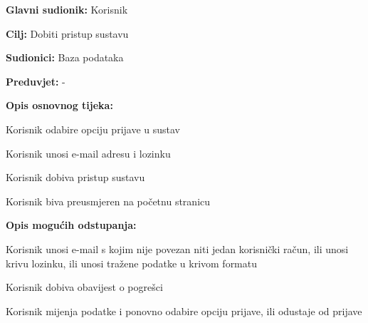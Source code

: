 					\noindent {}
					\begin{packed_item}
	
						\item \textbf{Glavni sudionik: }Korisnik
						\item  \textbf{Cilj:} Dobiti pristup sustavu
						\item  \textbf{Sudionici:} Baza podataka
						\item  \textbf{Preduvjet:} -
						\item  \textbf{Opis osnovnog tijeka:}
						
						\item[] \begin{packed_enum}
	
							\item Korisnik odabire opciju prijave u sustav
							\item Korisnik unosi e-mail adresu i lozinku
							\item Korisnik dobiva pristup sustavu
							\item Korisnik biva preusmjeren na početnu stranicu
						\end{packed_enum}
						
						\item  \textbf{Opis mogućih odstupanja:}
						
						\item[] \begin{packed_item}
	
							\item[3.a] Korisnik unosi e-mail s kojim nije povezan niti jedan korisnički račun, ili unosi krivu lozinku, ili unosi tražene podatke u krivom formatu
							\item[] \begin{packed_enum}
								
								\item Korisnik dobiva obavijest o pogrešci
								\item Korisnik mijenja podatke i ponovno odabire opciju prijave, ili odustaje od prijave
								
							\end{packed_enum}
							
						\end{packed_item}
					\end{packed_item}
					
